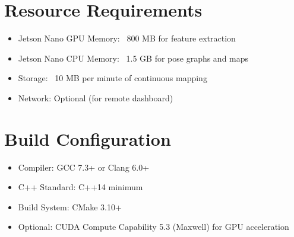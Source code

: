 \section{Resource Requirements}

\begin{itemize}
    \item Jetson Nano GPU Memory: ~800 MB for feature extraction
    \item Jetson Nano CPU Memory: ~1.5 GB for pose graphs and maps
    \item Storage: ~10 MB per minute of continuous mapping
    \item Network: Optional (for remote dashboard)
\end{itemize}

\section{Build Configuration}

\begin{itemize}
    \item Compiler: GCC 7.3+ or Clang 6.0+
    \item C++ Standard: C++14 minimum
    \item Build System: CMake 3.10+
    \item Optional: CUDA Compute Capability 5.3 (Maxwell) for GPU acceleration
\end{itemize}







